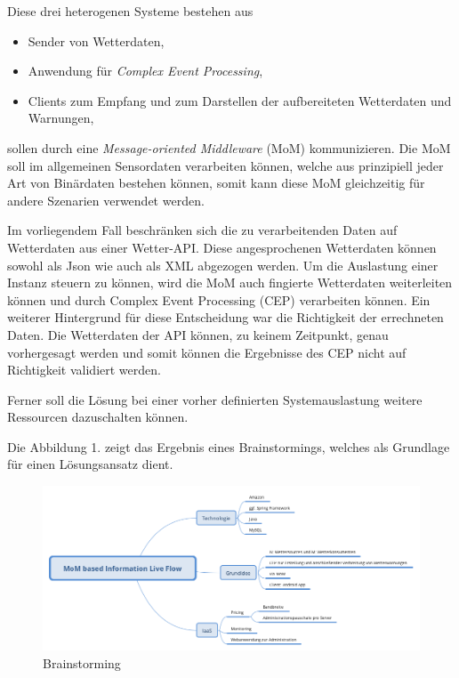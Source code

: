 \documentclass[paper,oneside,onecolumn,notitlepage,bibtotocnumbered,fontsize=12pt,bigheadings,ngerman]{scrartcl}
\begin{document}
Diese drei heterogenen Systeme bestehen aus
\begin{itemize}
\item Sender von Wetterdaten,
\item Anwendung für \textit{Complex Event Processing},
\item Clients zum Empfang und zum Darstellen der aufbereiteten Wetterdaten und Warnungen,
\end{itemize}
sollen durch eine \textit{Message-oriented Middleware} (MoM) kommunizieren. Die MoM soll im allgemeinen Sensordaten verarbeiten können, welche 
aus prinzipiell jeder Art von Binärdaten bestehen können, somit kann diese MoM gleichzeitig für andere Szenarien verwendet werden. 

Im vorliegendem Fall beschränken sich die zu verarbeitenden Daten auf Wetterdaten aus einer Wetter-API. Diese angesprochenen Wetterdaten können sowohl als Json wie auch als XML abgezogen werden. Um die Auslastung einer Instanz steuern zu können, wird die MoM auch fingierte Wetterdaten weiterleiten können und durch Complex Event Processing (CEP) verarbeiten können. Ein weiterer Hintergrund für diese Entscheidung war die Richtigkeit der errechneten Daten. Die Wetterdaten der API können, zu keinem Zeitpunkt, genau vorhergesagt werden und somit können die Ergebnisse des CEP nicht auf Richtigkeit validiert werden. 

Ferner soll die Lösung bei einer vorher definierten Systemauslastung weitere Ressourcen dazuschalten können. 

Die Abbildung 1. zeigt das Ergebnis eines Brainstormings, welches als Grundlage für einen Lösungsansatz dient.

\begin{figure}[!ht]
\centering
\includegraphics[width=450pt]{MoM based Information Live Flow.png}
\caption{Brainstorming}
\end{figure}
\end{document}
